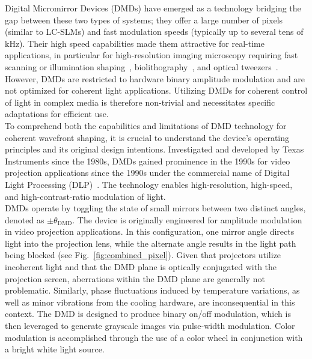 \documentclass[12pt]{iopart}
\begin{document}
Digital Micromirror Devices (DMDs) have emerged as a technology bridging the gap
between these two types of systems;
they offer a large number of pixels (similar to LC-SLMs) and fast modulation speeds (typically up to several tens of kHz).
Their high speed capabilities made them attractive for real-time applications,
in particular for high-resolution imaging microscopy
requiring fast scanning or illumination shaping~\cite{cha2000nontranslational,Zhuang2020},
biolithography~\cite{yoon2018emerging},
and optical tweezers~\cite{gauthier2016direct}.
However, DMDs are restricted to hardware binary amplitude modulation and are not optimized for coherent light applications.
Utilizing DMDs for coherent control of light in complex media is therefore non-trivial
and necessitates specific adaptations for efficient use.\\




To comprehend both the capabilities and limitations
of DMD technology for coherent wavefront shaping,
it is crucial to understand the device's operating principles
and its original design intentions.
Investigated and developed by Texas Instruments since the 1980s,
DMDs gained prominence in the 1990s for video projection applications since the 1990s
under the commercial name of Digital Light Processing (DLP)~\cite{hornbeck1997digital,Dudley2003emerging}.
The technology enables high-resolution, high-speed, and high-contrast-ratio modulation of light.\\
DMDs operate by toggling the state of small mirrors between two distinct angles, denoted as $\pm \theta_\text{DMD}$.
The device is originally engineered for amplitude modulation in video projection applications.
In this configuration, one mirror angle directs light into the projection lens,
while the alternate angle results in the light path being blocked (see Fig.~\ref{fig:combined_pixel}).
Given that projectors utilize incoherent light and that the DMD plane is optically conjugated with the projection screen,
aberrations within the DMD plane are generally not problematic.
Similarly, phase fluctuations induced by temperature variations,
as well as minor vibrations from the cooling hardware, are inconsequential in this context.
The DMD is designed to produce binary on/off modulation,
which is then leveraged to generate grayscale images via pulse-width modulation.
Color modulation is accomplished through the use of a color wheel in conjunction with a bright white light source.\\
\end{document}
